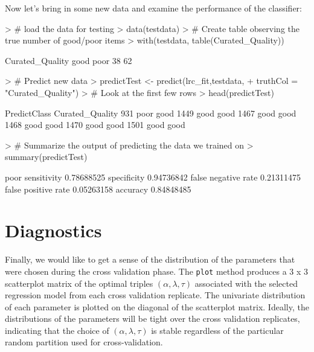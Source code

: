 \documentclass{article}
\begin{document}
\noindent Now let's bring in some new data and examine the performance of the classifier:
\begin{Schunk}
\begin{Sinput}
> # load the data for testing
> data(testdata)
> # Create table observing the true number of good/poor items 
> with(testdata, table(Curated_Quality))
\end{Sinput}
\begin{Soutput}
Curated_Quality
good poor 
  38   62 
\end{Soutput}
\begin{Sinput}
> # Predict new data
> predictTest <- predict(lrc_fit,testdata,
+                        truthCol = "Curated_Quality")
> # Look at the first few rows
> head(predictTest)
\end{Sinput}
\begin{Soutput}
     PredictClass Curated_Quality
931          poor            good
1449         good            good
1467         good            good
1468         good            good
1470         good            good
1501         good            good
\end{Soutput}
\begin{Sinput}
> # Summarize the output of predicting the data we trained on 
> summary(predictTest)
\end{Sinput}
\begin{Soutput}
                          poor
sensitivity         0.78688525
specificity         0.94736842
false negative rate 0.21311475
false positive rate 0.05263158
accuracy            0.84848485
\end{Soutput}
\end{Schunk}

\section{Diagnostics}

\noindent Finally, we would like to get a sense of the distribution of the parameters that were chosen 
during the cross validation phase. The {\tt plot} method produces a 3 x 3 scatterplot matrix of the optimal 
triples $\left(\alpha, \lambda, \tau\right)$ associated with the selected regression model from each cross 
validation replicate. The univariate distribution of each parameter is plotted on the diagonal of the 
scatterplot matrix.  Ideally, the distributions of the parameters will be tight over the cross validation 
replicates, indicating that the choice of $\left(\alpha, \lambda, \tau\right)$ is stable regardless of
the particular random partition used for cross-validation.
\end{document}
